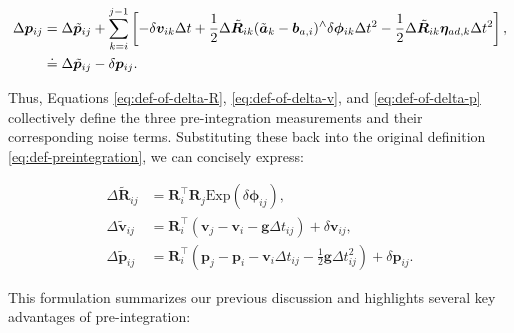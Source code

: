 \begin{equation}\label{eq:def-of-delta-p}
	\begin{aligned}
		\Delta \bm{p}_{ij} &= \Delta \tilde{\bm{p}}_{ij} + \sum_{k=i}^{j-1} \left[-\delta \bm{v}_{ik} \Delta t + 
		\frac{1}{2}\Delta \tilde{\bm{R}}_{ik} (\tilde{\bm{a}}_k - \bm{b}_{a,i})^\wedge \delta 
		\boldsymbol{\phi}_{ik} \Delta t^2 - \frac{1}{2} \Delta \tilde{\bm{R}}_{ik} \boldsymbol{\eta}_{ad, k} 
		\Delta t^2 \right], \\
		& \buildrel\textstyle.\over= \Delta\tilde{\bm{p}}_{ij} - \delta \bm{p}_{ij}.
	\end{aligned}
\end{equation}

Thus, Equations \eqref{eq:def-of-delta-R}, \eqref{eq:def-of-delta-v}, and \eqref{eq:def-of-delta-p} collectively define the three pre-integration measurements and their corresponding noise terms. Substituting these back into the original definition \eqref{eq:def-preintegration}, we can concisely express:

\begin{subequations}\label{key}
	\begin{align}
		\Delta \tilde{\bm{R}}_{ij} &= \bm{R}_i^\top \bm{R}_j \mathrm{Exp}(\delta 
		\boldsymbol{\phi}_{ij}), \\
		\Delta \tilde{\bm{v}}_{ij} &= \bm{R}_i^\top \left( \bm{v}_j - \bm{v}_i - \bm{g} \Delta t_{ij} \right) 
		+ \delta \bm{v}_{ij}, \\
		\Delta \tilde{\bm{p}}_{ij} &= \bm{R}_i^\top \left(\bm{p}_j - \bm{p}_i - \bm{v}_i \Delta t_{ij} - 
		\frac{1}{2}\bm{g} \Delta t_{ij}^2 \right) + \delta \bm{p}_{ij}.
	\end{align}
\end{subequations}

This formulation summarizes our previous discussion and highlights several key advantages of pre-integration:

